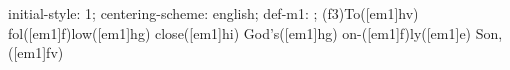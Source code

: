 initial-style: 1;
centering-scheme: english;
def-m1: \grealign;
(f3)To([em1]hv) fol([em1]f)low([em1]hg) close([em1]hi) God's([em1]hg) on-([em1]f)ly([em1]e) Son,([em1]fv)
